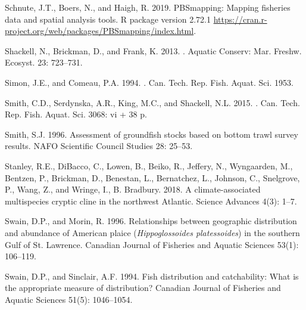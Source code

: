 \documentclass[12pt]{article}\usepackage[]{graphicx}\usepackage[]{color}
\begin{document}
\begin{CSLReferences}{1}{0}
\leavevmode\hypertarget{ref-R:package:PBSmapping}{}%
Schnute, J.T., Boers, N., and Haigh, R. 2019. PBSmapping: Mapping fisheries data and spatial analysis tools. R package version 2.72.1 \url{https://cran.r-project.org/web/packages/PBSmapping/index.html}.

\leavevmode\hypertarget{ref-Shackell2013}{}%
Shackell, N., Brickman, D., and Frank, K. 2013. . Aquatic Conserv: Mar. Freshw. Ecosyst. 23: 723--731.

\leavevmode\hypertarget{ref-Simon:Comeau:1994}{}%
Simon, J.E., and Comeau, P.A. 1994. . Can. Tech. Rep. Fish. Aquat. Sci. 1953.

\leavevmode\hypertarget{ref-Smith2015}{}%
Smith, C.D., Serdynska, A.R., King, M.C., and Shackell, N.L. 2015. . Can. Tech. Rep. Fish. Aquat. Sci. 3068: vi + 38 p.

\leavevmode\hypertarget{ref-Smith:1996}{}%
Smith, S.J. 1996. Assessment of groundfish stocks based on bottom trawl survey results. {NAFO} Scientific Council Studies 28: 25--53.

\leavevmode\hypertarget{ref-Stanley:2018}{}%
Stanley, R.E., DiBacco, C., Lowen, B., Beiko, R., Jeffery, N., Wyngaarden, M., Bentzen, P., Brickman, D., Benestan, L., Bernatchez, L., Johnson, C., Snelgrove, P., Wang, Z., and Wringe, I., B. Bradbury. 2018. A climate-associated multispecies cryptic cline in the northwest {A}tlantic. Science {A}dvances 4(3): 1--7.

\leavevmode\hypertarget{ref-Swain:Morin:1996:cjfas}{}%
Swain, D.P., and Morin, R. 1996. Relationships between geographic distribution and abundance of {A}merican plaice (\emph{{H}ippoglossoides platessoides}) in the southern {G}ulf of {S}t. {L}awrence. Canadian Journal of Fisheries and Aquatic Sciences 53(1): 106--119.

\leavevmode\hypertarget{ref-Swain:Sinclair:1994:cjfas}{}%
Swain, D.P., and Sinclair, A.F. 1994. Fish distribution and catchability: {W}hat is the appropriate measure of distribution? Canadian Journal of Fisheries and Aquatic Sciences 51(5): 1046--1054.


\end{CSLReferences}
\end{document}
